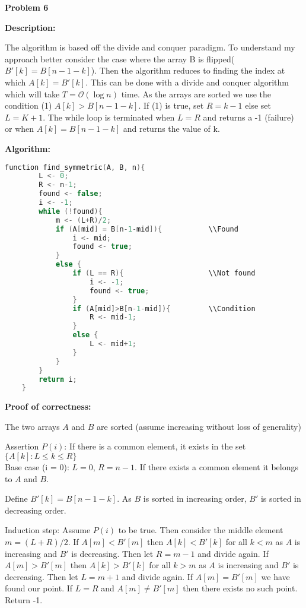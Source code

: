 \documentclass[10pt, a4paper]{article}
\newcommand{\BigO}{\mathcal{O}}
\begin{document}
\newpage
\noindent\large{\textbf{Problem 6}}
\vspace{5pt}

\normalsize

\noindent\textbf{Description:}

The algorithm is based off the divide and conquer paradigm. To understand my approach better consider the case where the array B is flipped($B'[k]=B[n-1-k]$). Then the algorithm reduces to finding the index at which $A[k] = B'[k]$. This can be done with a divide and conquer algorithm which will take $T=\BigO(\log n)$ time. As the arrays are sorted we use the condition (1) $A[k] > B[n-1-k]$. If (1) is true, set $R = k-1$ else set $L = K+1$. The while loop is terminated when $L = R$ and returns a -1 (failure) or when $A[k] = B[n-1-k]$ and returns the value of k.

\noindent\textbf{Algorithm:}
\begin{lstlisting}[language=C++,caption= Find symmetric]
    function find_symmetric(A, B, n){
        L <- 0;
        R <- n-1;
        found <- false;
        i <- -1;
        while (!found){
            m <- (L+R)/2;
            if (A[mid] = B[n-1-mid]){           \\Found
                i <- mid;
                found <- true;
            }
            else {
                if (L == R){                    \\Not found
                    i <- -1;
                    found <- true;
                }
                if (A[mid]>B[n-1-mid]){         \\Condition
                    R <- mid-1;
                }
                else {
                    L <- mid+1;
                }
            }
        }
        return i;
    }
\end{lstlisting}


\noindent\textbf{Proof of correctness:}

The two arrays $A$ and $B$ are sorted (assume increasing without loss of generality)

Assertion $P(i)$: If there is a common element, it exists in the set $\{A[k]:L\leq k\leq R\}$\\
Base case (i = 0): $L = 0$, $R = n-1$. If there exists a common element it belongs to $A$ and $B$.

Define $B'[k] = B[n-1-k]$. As $B$ is sorted in increasing order, $B'$ is sorted in decreasing order.

Induction step: Assume $P(i)$ to be true. Then consider the middle element $m = (L+R)/2$. If $A[m] < B'[m]$ then $A[k]<B'[k]$ for all $k<m$ as $A$ is increasing and $B'$ is decreasing. Then let $R = m-1$ and divide again. If $A[m]>B'[m]$ then $A[k]>B'[k]$ for all $k>m$ as $A$ is increasing and $B'$ is decreasing. Then let $L = m+1$ and divide again. If $A[m]=B'[m]$ we have found our point. If $L = R$ and $A[m]\neq B'[m]$ then there exists no such point. Return -1.
\end{document}
